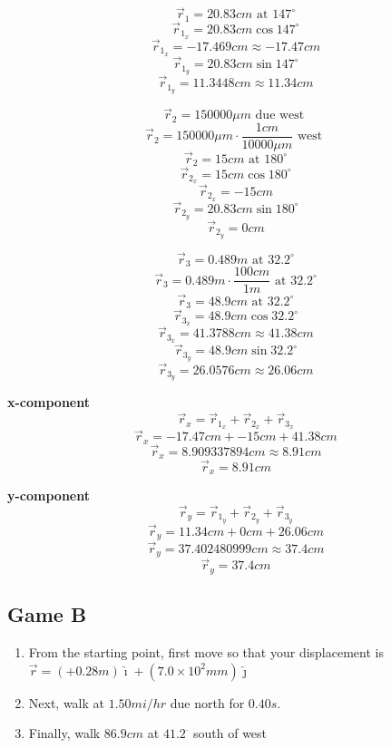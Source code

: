 \documentclass[11pt, letterpaper, includehead]{article}
\begin{document}
\begin{multicols}{3}
  $$\vec{r}_1 = 20.83cm\text{ at }147^{\circ}$$
  $$\vec{r}_{1_x} = 20.83cm\cos147^{\circ}$$
  $$\vec{r}_{1_x} = -17.469cm \approx -17.47cm$$
  $$\vec{r}_{1_y} = 20.83cm\sin147^{\circ}$$
  $$\vec{r}_{1_y} = 11.3448cm \approx 11.34cm$$
  \columnbreak

  $$\vec{r}_2 = 150000\mu m\text{ due west }$$
  $$\vec{r}_2 = 150000\mu m\cdot\frac{1cm}{10000\mu m}\text{ west }$$
  $$\vec{r}_2 = 15cm\text{ at }180^{\circ}$$
  $$\vec{r}_{2_x} = 15cm\cos180^{\circ}$$
  $$\vec{r}_{2_x} = -15cm$$
  $$\vec{r}_{2_y} = 20.83cm\sin180^{\circ}$$
  $$\vec{r}_{2_y} = 0cm$$

  \columnbreak
  $$\vec{r}_3 = 0.489m\text{ at }32.2^{\circ}$$
  $$\vec{r}_3 = 0.489m\cdot\frac{100cm}{1m}\text{ at }32.2^{\circ}$$
  $$\vec{r}_3 = 48.9cm\text{ at }32.2^{\circ}$$
  $$\vec{r}_{3_x} = 48.9cm\cos32.2^{\circ}$$
  $$\vec{r}_{3_x} = 41.3788cm \approx 41.38cm$$
  $$\vec{r}_{3_y} = 48.9cm\sin32.2^{\circ}$$
  $$\vec{r}_{3_y} = 26.0576cm \approx 26.06cm$$

\end{multicols}

\hspace{0.5cm}

\begin{multicols}{2}
  \centering\textbf{x-component}
  $$\vec{r}_x = \vec{r}_{1_x} + \vec{r}_{2_x} + \vec{r}_{3_x}$$
  $$\vec{r}_x = -17.47cm + -15cm + 41.38cm$$
  $$\vec{r}_x = 8.909337894cm \approx{8.91cm}$$
  $$\boxed{\vec{r}_x = {8.91cm}}$$

  \columnbreak
  \centering\textbf{y-component}
  $$\vec{r}_y = \vec{r}_{1_y} + \vec{r}_{2_y} + \vec{r}_{3_y}$$
  $$\vec{r}_y = 11.34cm +  0cm + 26.06cm$$
  $$\vec{r}_y = 37.402480999cm \approx 37.4cm$$
  $$\boxed{\vec{r}_y = 37.4cm}$$
  
\end{multicols}

\subsection{Game B} %
\begin{enumerate}
  \item From the starting point, first move so that your displacement is
  \\ $\vec{r} = (+0.28m)\hat\imath+(7.0 \times 10^2mm)\hat\jmath$
  \item Next, walk at $1.50 mi/hr$ due north for $ 0.40 s$.
  \item Finally, walk $86.9 cm$ at $41.2^{\cdot}$ south of west
\end{enumerate}
\end{document}
